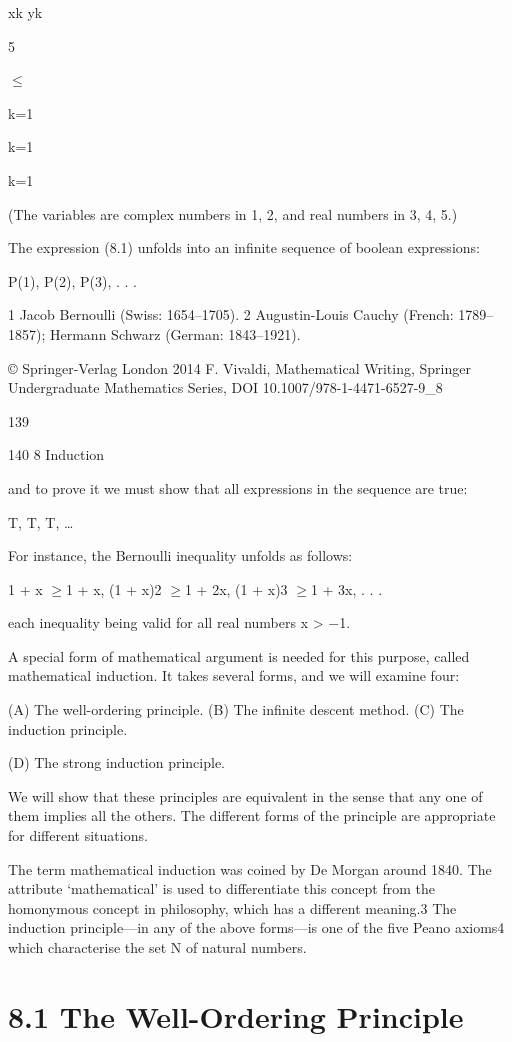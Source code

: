 \documentclass[11pt]{article}
\theoremstyle{plain}
\theoremstyle{definition}
\begin{document}
xk yk

5

$\leq$

k=1

k=1

k=1

(The variables are complex numbers in 1, 2, and real numbers in 3, 4, 5.)

The expression (8.1) unfolds into an infinite sequence of boolean expressions:

P(1), P(2), P(3), . . .

1 Jacob Bernoulli (Swiss: 1654--1705). 2 Augustin-Louis Cauchy (French: 1789--1857); Hermann Schwarz (German: 1843--1921).

© Springer-Verlag London 2014 F. Vivaldi, Mathematical Writing, Springer Undergraduate Mathematics Series, DOI 10.1007/978-1-4471-6527-9\_8

139

140 8 Induction

and to prove it we must show that all expressions in the sequence are true:

T, T, T, \dots{}

For instance, the Bernoulli inequality unfolds as follows:

1 + x $\geq$1 + x, (1 + x)2 $\geq$1 + 2x, (1 + x)3 $\geq$1 + 3x, . . .

each inequality being valid for all real numbers x > $-$1.

A special form of mathematical argument is needed for this purpose, called mathematical induction. It takes several forms, and we will examine four:

(A) The well-ordering principle. (B) The infinite descent method. (C) The induction principle.

(D) The strong induction principle.

We will show that these principles are equivalent in the sense that any one of them implies all the others. The different forms of the principle are appropriate for different situations.

The term mathematical induction was coined by De Morgan around 1840. The attribute `mathematical' is used to differentiate this concept from the homonymous concept in philosophy, which has a different meaning.3 The induction principle---in any of the above forms---is one of the five Peano axioms4 which characterise the set N of natural numbers.

\section{8.1 The Well-Ordering Principle}
\end{document}
